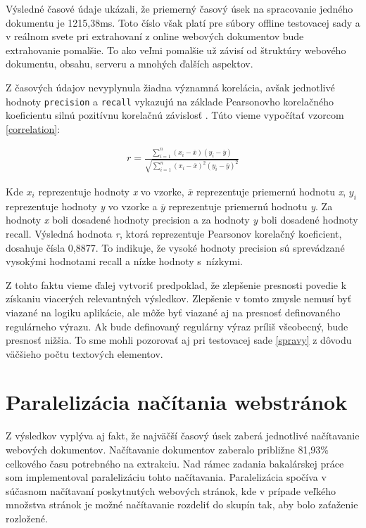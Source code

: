Výsledné časové údaje ukázali, že priemerný časový úsek na spracovanie jedného dokumentu je 1215,38ms. Toto číslo však platí pre súbory offline testovacej sady a v reálnom svete pri extrahovaní z online webových dokumentov bude extrahovanie pomalšie. To ako veľmi pomalšie už závisí od štruktúry webového dokumentu, obsahu, serveru a mnohých ďalších aspektov.

Z časových údajov nevyplynula žiadna významná korelácia, avšak jednotlivé hodnoty \texttt{precision} a \texttt{recall} vykazujú na základe Pearsonovho korelačného koeficientu silnú pozitívnu korelačnú závislosť \cite{statistics}. Túto vieme vypočítať vzorcom \ref{correlation}:

\begin{eqnarray}
\label{correlation}
    r = \frac{{}\sum_{i=1}^{n} (x_i - \overline{x})(y_i - \overline{y})}
{\sqrt{\sum_{i=1}^{n} (x_i - \overline{x})^2(y_i - \overline{y})^2}}
    \end{eqnarray}

Kde $x_i$ reprezentuje hodnoty \textit{x} vo vzorke, $\overline{x}$ reprezentuje priemernú hodnotu \textit{x}, $y_i$ reprezentuje hodnoty \textit{y} vo vzorke a $\overline{y}$ reprezentuje priemernú hodnotu \textit{y}. Za hodnoty \textit{x} boli dosadené hodnoty precision a za hodnoty \textit{y} boli dosadené hodnoty recall. Výsledná hodnota \textit{r}, ktorá reprezentuje Pearsonov korelačný koeficient, dosahuje čísla 0,8877. To indikuje, že vysoké hodnoty precision sú sprevádzané vysokými hodnotami recall a nízke hodnoty s~nízkymi. 

Z tohto faktu vieme ďalej vytvoriť predpoklad, že zlepšenie presnosti povedie k získaniu viacerých relevantných výsledkov. Zlepšenie v tomto zmysle nemusí byť viazané na logiku aplikácie, ale môže byť viazané aj na presnosť definovaného regulárneho výrazu. Ak bude definovaný regulárny výraz príliš všeobecný, bude presnosť nižšia. To sme mohli pozorovať aj pri testovacej sade  \ref{spravy} z dôvodu väčšieho počtu textových elementov.

\section{Paralelizácia načítania webstránok}

Z výsledkov vyplýva aj fakt, že najväčší časový úsek zaberá jednotlivé načítavanie webových dokumentov. Načítavanie dokumentov zaberalo približne 81,93\% celkového času potrebného na extrakciu. Nad rámec zadania bakalárskej práce som implementoval paralelizáciu tohto načítavania. Paralelizácia spočíva v súčasnom načítavaní poskytnutých webových stránok, kde v prípade veľkého množstva stránok je možné načítavanie rozdeliť do skupín tak, aby bolo zaťaženie rozložené.

